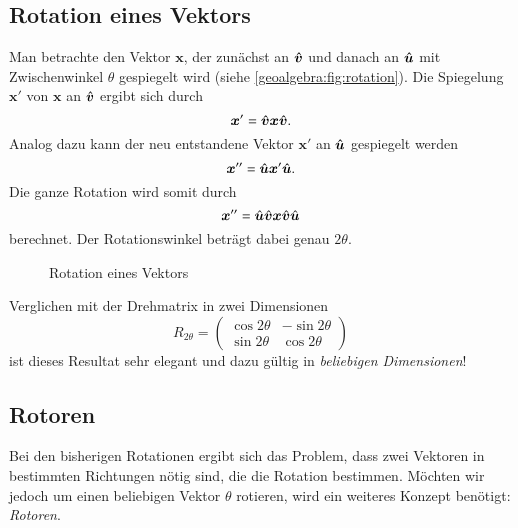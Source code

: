 \subsection{Rotation eines Vektors}
Man betrachte den Vektor $\boldsymbol{x}$, der zunächst an $\v$ und danach an $\u$ mit Zwischenwinkel $\theta$ gespiegelt wird (siehe \autoref{geoalgebra:fig:rotation}).
Die Spiegelung $\boldsymbol{x}'$ von $\boldsymbol{x}$ an $\v$ ergibt sich durch
\begin{equation*}
\boldsymbol{x}' = \v \boldsymbol{x} \v.
\end{equation*}
Analog dazu kann der neu entstandene Vektor $\boldsymbol{x}'$ an $\u$ gespiegelt werden
\begin{equation*}
\boldsymbol{x}'' = \u \boldsymbol{x}' \u.
\end{equation*}
Die ganze Rotation wird somit durch
\begin{equation}
\boldsymbol{x}'' = \u \v \boldsymbol{x} \v \u
  \label{geoalgebra:eq:rotation}
\end{equation}
berechnet. Der Rotationswinkel beträgt dabei genau $2\theta$.
\begin{figure}
  \begin{center}

  \end{center}
  \caption{Rotation eines Vektors}
\label{geoalgebra:fig:rotation}
\end{figure}
Verglichen mit der Drehmatrix in zwei Dimensionen
\begin{equation*}
  R_{2\theta} = \begin{pmatrix}
    \cos{2\theta} & -\sin{2\theta} \\
    \sin{2\theta} & \cos{2\theta}
  \end{pmatrix}
\end{equation*}
ist dieses Resultat sehr elegant und dazu gültig in \emph{beliebigen Dimensionen}!

\subsection{Rotoren}
Bei den bisherigen Rotationen ergibt sich das Problem, dass zwei Vektoren
in bestimmten Richtungen nötig sind, die die Rotation bestimmen. Möchten wir
jedoch um einen beliebigen Vektor $\theta$ rotieren, wird ein weiteres Konzept
benötigt: \emph{Rotoren}.

